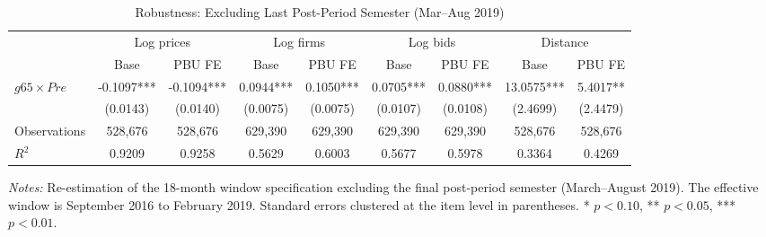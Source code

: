 \begin{table}[htbp]
\centering
\caption{Robustness: Excluding Last Post-Period Semester (Mar--Aug 2019)}
\label{tab:excl_lastpost}
\begin{adjustbox}{max width=\textwidth}
\begin{threeparttable}
\small
\begin{tabular}{lcccccccc}
\toprule
 & \multicolumn{2}{c}{Log prices} & \multicolumn{2}{c}{Log firms} & \multicolumn{2}{c}{Log bids} & \multicolumn{2}{c}{Distance} \\
\cmidrule(lr){2-3} \cmidrule(lr){4-5} \cmidrule(lr){6-7} \cmidrule(lr){8-9}
 & Base & PBU FE & Base & PBU FE & Base & PBU FE & Base & PBU FE \\
\midrule
$g65 \times Pre$ & -0.1097*** & -0.1094*** & 0.0944*** & 0.1050*** & 0.0705*** & 0.0880*** & 13.0575*** & 5.4017** \\
 & (0.0143) & (0.0140) & (0.0075) & (0.0075) & (0.0107) & (0.0108) & (2.4699) & (2.4479) \\
\midrule
Observations & 528,676 & 528,676 & 629,390 & 629,390 & 629,390 & 629,390 & 528,676 & 528,676 \\
$R^2$ & 0.9209 & 0.9258 & 0.5629 & 0.6003 & 0.5677 & 0.5978 & 0.3364 & 0.4269 \\
\bottomrule
\end{tabular}
\begin{tablenotes}
\small
\item \textit{Notes:} Re-estimation of the 18-month window specification excluding the final post-period semester (March--August 2019). The effective window is September 2016 to February 2019. Standard errors clustered at the item level in parentheses. * $p<0.10$, ** $p<0.05$, *** $p<0.01$.
\end{tablenotes}
\end{threeparttable}
\end{adjustbox}
\end{table}

